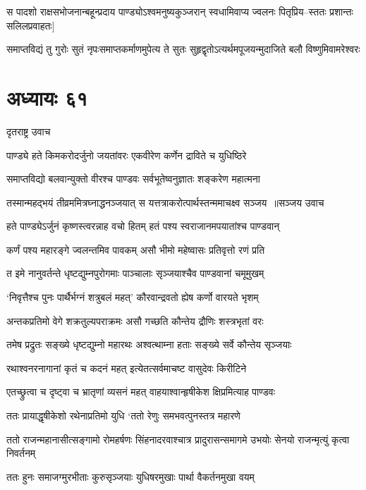 \twolineshloka
{स पादशो राक्षसभोजनान्बहून्प्रदाय पाण्ड्योऽश्वमनुष्यकुञ्जरान्}
{स्वधामिवाप्य ज्वलनः पितृप्रिय--स्ततः प्रशान्तः सलिलप्रवाहतः]}


\twolineshloka
{समाप्तविद्यं तु गुरोः सुतं नृपःसमाप्तकर्माणमुपेत्य ते सुतः}
{सुहृद्वृतोऽत्यर्थमपूजयन्मुदाजिते बलौ विष्णुमिवामरेश्वरः}


\chapter{अध्यायः ६१}
\twolineshloka
{दृतराष्ट्र उवाच}
{}


\twolineshloka
{पाण्ड्ये हते किमकरोदर्जुनो जयतांवरः}
{एकवीरेण कर्णेन द्राविते च युधिष्ठिरे}


\twolineshloka
{समाप्तविद्यो बलवान्युक्तो वीरश्च पाण्डवः}
{सर्वभूतेष्वनुज्ञातः शङ्करेण महात्मना}


\threelineshloka
{तस्मान्महद्भयं तीव्रममित्रघ्नाद्धनञ्जयात्}
{स यत्तत्राकरोत्पार्थस्तन्ममाचक्ष्व सञ्जय ॥सञ्जय उवाच}
{}


\twolineshloka
{हते पाण्ड्येऽर्जुनं कृष्णस्त्वरन्नाह वचो हितम्}
{हतं पश्य स्वराजानमपयातांश्च पाण्डवान्}


\twolineshloka
{कर्णं पश्य महारङ्गे ज्वलन्तमिव पावकम्}
{असौ भीमो महेष्वासः प्रतिवृत्तो रणं प्रति}


\twolineshloka
{त इमे नानुवर्तन्ते धृष्टद्युम्नपुरोगमाः}
{पाञ्चालाः सृञ्जयाश्चैव पाण्डवानां चमूमुखम्}


\twolineshloka
{`निवृत्तैश्च पुनः पार्थैर्भग्नं शत्रुबलं महत्'}
{कौरवान्द्रवतो ह्येष कर्णो वारयते भृशम्}


\twolineshloka
{अन्तकप्रतिमो वेगे शक्रतुल्यपराक्रमः}
{असौ गच्छति कौन्तेय द्रौणिः शस्त्रभृतां वरः}


\twolineshloka
{तमेष प्रद्रुतः सङ्ख्ये धृष्टद्युम्नो महारथः}
{अश्वत्थाम्ना हताः सङ्ख्ये सर्वे कौन्तेय सृञ्जयाः}


\twolineshloka
{रथाश्वनरनागानां कृतं च कदनं महत्}
{इत्येतत्सर्वमाचष्ट वासुदेवः किरीटिने}


\twolineshloka
{एतच्छ्रुत्वा च दृष्ट्वा च भ्रातृणां व्यसनं महत्}
{वाहयाश्वान्हृषीकेश क्षिप्रमित्याह पाण्डवः}


\twolineshloka
{ततः प्रायाद्धृषीकेशो रथेनाप्रतिमो युधि}
{`ततो रेणुः समभवत्पुनस्तत्र महारणे}


\threelineshloka
{ततो राजन्महानासीत्सङ्गामो रोमहर्षणः}
{सिंहनादरवाश्चात्र प्रादुरासन्समागमे}
{उभयोः सेनयो राजन्मृत्युं कृत्वा निवर्तनम्}


\twolineshloka
{ततः हुनः समाजग्मुरभीताः कुरुसृञ्जयाः}
{युधिषरमुखाः पार्था वैकर्तनमुखा वयम्}


